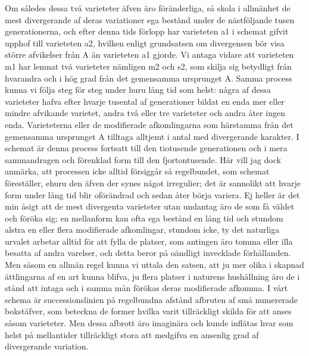 Om således dessa två varieteter äfven äro föränderliga, så skola i allmänhet de mest divergerande af deras variationer ega bestånd under de nästföljande tusen generationerna, och efter denna tids förlopp har varieteten a1 i schemat gifvit upphof till varieteten a2, hvilken enligt grundsatsen om divergensen bör visa större afvikelser från A än varieteten a1 gjorde. Vi antaga vidare att varieteten m1 har lemnat två varieteter nämligen m2 och s2, som skilja sig betydligt från hvarandra och i hög grad från det gemensamma ursprunget A. Samma process kunna vi följa steg för steg under huru lång tid som helst: några af dessa varieteter hafva efter hvarje tusental af generationer bildat en enda mer eller mindre afvikande varietet, andra två eller tre varieteter och andra åter ingen enda. Varieteterna eller de modifierade afkomlingarna som härstamma från det gemensamma ursprunget A tilltaga alltjemt i antal med divergerande karakter. I schemat är denna process fortsatt till den tiotusende generationen och i mera sammandragen och förenklad form till den fjortontusende.
Här vill jag dock anmärka, att processen icke alltid försiggår så regelbundet, som schemat föreställer, ehuru den äfven der synes något irregulier; det är sannolikt att hvarje form under lång tid blir oförändrad och sedan åter börja variera. Ej heller är det min åsigt att de mest divergenta varieteter utan undantag äro de som få väldet och föröka sig; en mellanform kan ofta ega bestånd en lång tid och stundom alstra en eller flera modifierade afkomlingar, stundom icke, ty det naturliga urvalet arbetar alltid för att fylla de platser, som antingen äro tomma eller illa besatta af andra varelser, och detta beror på oändligt invecklade förhållanden. Men såsom en allmän regel kunna vi uttala den satsen, att ju mer olika i skapnad ättlingarna af en art kunna blifva, ju flera platser i naturens hushållning äro de i stånd att intaga och i samma mån förökas deras modifierade afkomma. I vårt schema är successionslinien på regelbundna afstånd afbruten af små numererade bokstäfver, som beteckna de former hvilka varit tillräckligt skilda för att anses såsom varieteter. Men dessa afbrott äro imaginära och kunde inflätas hvar som helst på mellantider tillräckligt stora att medgifva en ansenlig grad af divergerande variation.

